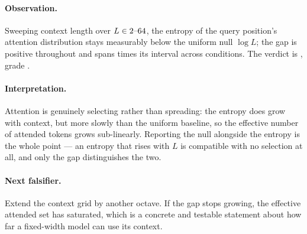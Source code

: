 \paragraph{Observation.}
Sweeping context length over
$L\in2\text{--}64{}$, the entropy of the query position's
attention distribution stays measurably below the uniform null $\log L$; the
gap is positive throughout and spans
\AtlasContextScalingSemanticRatio{} times its interval across
\AtlasContextScalingConditions{} conditions. The verdict is
\emph{\AtlasContextScalingVerdict{}}, grade \AtlasContextScalingGrade{}.

\paragraph{Interpretation.}
Attention is genuinely selecting rather than spreading: the entropy does grow
with context, but more slowly than the uniform baseline, so the effective
number of attended tokens grows sub-linearly. Reporting the null alongside the
entropy is the whole point --- an entropy that rises with $L$ is compatible with
no selection at all, and only the gap distinguishes the two.

\paragraph{Next falsifier.}
Extend the context grid by another octave. If the gap stops growing, the
effective attended set has saturated, which is a concrete and testable
statement about how far a fixed-width model can use its context.
